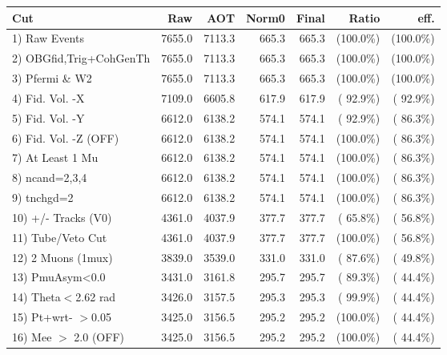  \begin{table}[h!]\centering
 \begin{tabular}{||l||r|r|r|r|r|r||}
 \hline
 \hline
 Cut & Raw & AOT & Norm0 & Final & Ratio & eff.       \\
 \hline
  1) Raw Events           &       7655.0 &       7113.3 &        665.3 &        665.3 & (100.0\%) & (100.0\%) \\
  2) OBGfid,Trig+CohGenTh &       7655.0 &       7113.3 &        665.3 &        665.3 & (100.0\%) & (100.0\%) \\
  3) Pfermi \& W2         &       7655.0 &       7113.3 &        665.3 &        665.3 & (100.0\%) & (100.0\%) \\
  4) Fid. Vol. -X         &       7109.0 &       6605.8 &        617.9 &        617.9 & ( 92.9\%) & ( 92.9\%) \\
  5) Fid. Vol. -Y         &       6612.0 &       6138.2 &        574.1 &        574.1 & ( 92.9\%) & ( 86.3\%) \\
  6) Fid. Vol. -Z (OFF)   &       6612.0 &       6138.2 &        574.1 &        574.1 & (100.0\%) & ( 86.3\%) \\
  7) At Least 1 Mu        &       6612.0 &       6138.2 &        574.1 &        574.1 & (100.0\%) & ( 86.3\%) \\
  8) ncand=2,3,4          &       6612.0 &       6138.2 &        574.1 &        574.1 & (100.0\%) & ( 86.3\%) \\
  9) tnchgd=2             &       6612.0 &       6138.2 &        574.1 &        574.1 & (100.0\%) & ( 86.3\%) \\
 10) +/- Tracks (V0)      &       4361.0 &       4037.9 &        377.7 &        377.7 & ( 65.8\%) & ( 56.8\%) \\
 11) Tube/Veto Cut        &       4361.0 &       4037.9 &        377.7 &        377.7 & (100.0\%) & ( 56.8\%) \\
 12) 2 Muons (1mux)       &       3839.0 &       3539.0 &        331.0 &        331.0 & ( 87.6\%) & ( 49.8\%) \\
 13) PmuAsym<0.0          &       3431.0 &       3161.8 &        295.7 &        295.7 & ( 89.3\%) & ( 44.4\%) \\
 14) Theta$<$2.62 rad     &       3426.0 &       3157.5 &        295.3 &        295.3 & ( 99.9\%) & ( 44.4\%) \\
 15) Pt+wrt- $>$0.05      &       3425.0 &       3156.5 &        295.2 &        295.2 & (100.0\%) & ( 44.4\%) \\
 16) Mee $>$ 2.0  (OFF)   &       3425.0 &       3156.5 &        295.2 &        295.2 & (100.0\%) & ( 44.4\%) \\

\end{tabular}
\end{table}
